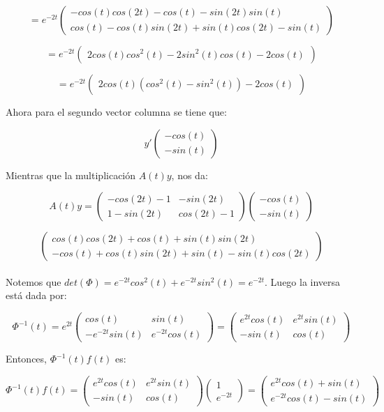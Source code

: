 $$=e^{-2t}\begin{pmatrix}
-cos(t)cos(2t)-cos(t)-sin(2t)sin(t)\\
cos(t)-cos(t)sin(2t)+sin(t)cos(2t)-sin(t)
\end{pmatrix}$$
    
$$=e^{-2t} \begin{pmatrix}
2cos(t) cos^2(t) -2sin^2(t) cos(t)- 2cos(t)
\end{pmatrix}$$

$$=e^{-2t} \begin{pmatrix}
2cos(t)(cos^2(t)- sin^2(t)) -2cos(t)
\end{pmatrix}$$

Ahora para el segundo vector columna se tiene que:

$$y'\begin{pmatrix}
-cos(t)\\
-sin(t)
\end{pmatrix}$$

Mientras que la multiplicación $A(t)y$, nos da: 

$$A(t)y= \begin{pmatrix}
-cos(2t)-1 & -sin(2t)\\
1-sin(2t) & cos(2t)-1 
\end{pmatrix}
\begin{pmatrix}
-cos(t)\\
-sin(t)
\end{pmatrix}$$


$$\begin{pmatrix}
cos(t)cos(2t)+ cos(t)+ sin(t)sin(2t)\\
-cos(t)+ cos(t)sin(2t)+ sin(t)- sin(t)cos(2t)
\end{pmatrix}$$\\

Notemos que $det(\Phi)= e^{-2t}cos^2(t)+ e^{-2t}sin^2(t)= e^{-2t}$. Luego la inversa está dada por: 

$$\Phi^{-1}(t)= e^{2t} \begin{pmatrix}
cos(t) & sin(t)\\
-e^{-2t}sin(t) & e^{-2t}cos(t)
\end{pmatrix}= 
\begin{pmatrix}
e^{2t}cos(t) & e^{2t}sin(t)\\
-sin(t)  & cos(t)
\end{pmatrix}$$

Entonces, $\Phi^{-1}(t) f(t)$ es: 

$$\Phi^{-1}(t) f(t)= \begin{pmatrix}
e^{2t}cos(t) & e^{2t}sin(t)\\
-sin(t)  & cos(t)
\end{pmatrix}
\begin{pmatrix}
1\\
e^{-2t}
\end{pmatrix}=
\begin{pmatrix}
e^{2t}cos(t)+ sin(t)\\
e^{-2t}cos(t)- sin(t)
\end{pmatrix}$$

